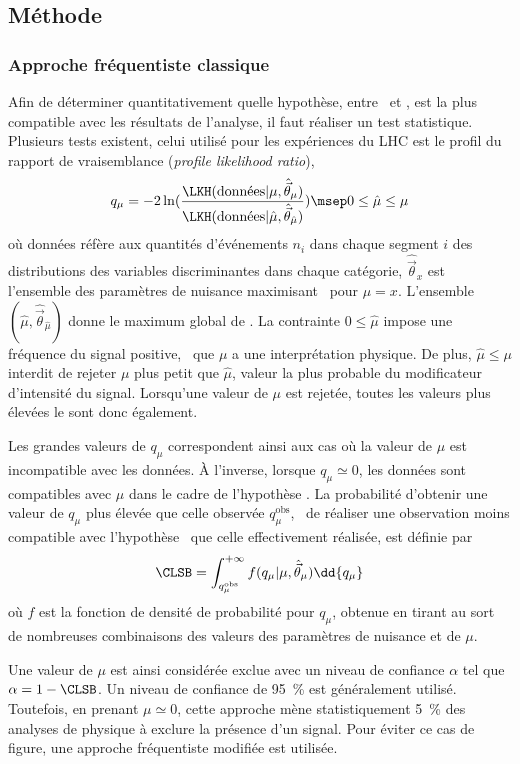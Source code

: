 \subsection{Méthode \CLS}\label{chapter-HTT_analysis-section-signal_extraction-CLS}
\subsubsection{Approche fréquentiste classique}
Afin de déterminer quantitativement quelle hypothèse, entre \hypB\ et \hypSB, est la plus compatible avec les résultats de l'analyse, il faut réaliser un test statistique.
Plusieurs tests existent, celui utilisé pour les expériences du LHC est le profil du rapport de vraisemblance (\emph{profile likelihood ratio}),
\begin{equation}
q_{\mu} = -2 \ln(\frac{\LKH(\text{données} |  \mu, \hat{\vec{\theta}}_{\mu})}{\LKH(\text{données} |  \hat{\mu}, \hat{\vec{\theta}}_{\hat{\mu}})})
\msep
0 \leq \hat{\mu} \leq \mu
\end{equation}
où
\og données \fg{} réfère aux quantités d'événements $n_i$ dans chaque segment $i$ des distributions des variables discriminantes dans chaque catégorie,
$\hat{\vec{\theta}}_x$ est l'ensemble des paramètres de nuisance maximisant \LKH\ pour $\mu=x$.
L'ensemble $(\hat{\mu},\hat{\vec{\theta}}_{\hat{\mu}})$ donne le maximum global de \LKH.
La contrainte $0 \leq \hat{\mu}$ impose une fréquence du signal positive, \ie\ que $\mu$ a une interprétation physique.
De plus, $\hat{\mu} \leq \mu$ interdit de rejeter $\mu$ plus petit que $\hat{\mu}$, valeur la plus probable du modificateur d'intensité du signal.
Lorsqu'une valeur de $\mu$ est rejetée, toutes les valeurs plus élevées le sont donc également.
\par
Les grandes valeurs de $q_{\mu}$ correspondent ainsi aux cas où la valeur de $\mu$ est incompatible avec les données.
À l'inverse, lorsque $q_{\mu}\simeq0$, les données sont compatibles avec $\mu$ dans le cadre de l'hypothèse \hypSB.
La probabilité d'obtenir une valeur de $q_{\mu}$ plus élevée que celle observée $q_{\mu}^\text{obs}$,
\ie\ de réaliser une observation moins compatible avec l'hypothèse \hypSB\ que celle effectivement réalisée,
est définie par
\begin{equation}
\CLSB = \int_{q_{\mu}^\text{obs}}^{+\infty} f (q_\mu | \mu, \hat{\vec{\theta}}_\mu) \dd{q_\mu}
\end{equation}
où $f$ est la fonction de densité de probabilité pour $q_{\mu}$, obtenue en tirant au sort de nombreuses combinaisons des valeurs des paramètres de nuisance et de $\mu$.
\par
Une valeur de $\mu$ est ainsi considérée exclue avec un niveau de confiance $\alpha$ tel que
$\alpha = 1 - \CLSB$.
Un niveau de confiance de \SI{95}{\%} est généralement utilisé.
Toutefois, en prenant $\mu\simeq0$, cette approche mène statistiquement \SI{5}{\%} des analyses de physique à exclure la présence d'un signal.
Pour éviter ce cas de figure, une approche fréquentiste modifiée est utilisée.

